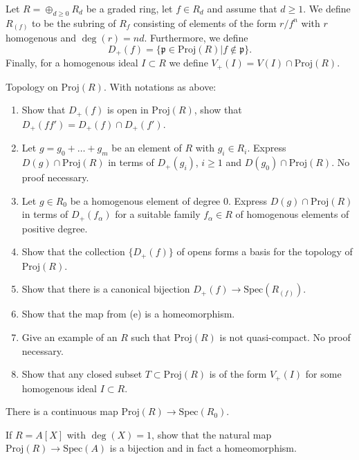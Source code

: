 \begin{definition}
\label{definition-Dplus-Vplus}
Let $R = \oplus_{d \geq 0} R_d$ be a graded ring, let $f\in R_d$ and
assume that $d \geq 1$. We define {\it $R_{(f)}$} to be the subring of
$R_f$ consisting of elements of the form $r/f^n$ with $r$ homogenous and
$\deg(r) = nd$. Furthermore, we define
$$
D_{+}(f) = \{ {\mathfrak p} \in \text{Proj}(R) | f \not\in {\mathfrak p} \}.
$$
Finally, for a homogenous ideal $I \subset R$ we define
$V_{+}(I) = V(I) \cap \text{Proj}(R)$.
\end{definition}

\begin{exercise}
\label{exercise-topology-proj}
Topology on $\text{Proj}(R)$. With notations as above:
\begin{enumerate}
\item Show that $D_{+}(f)$ is open in $\text{Proj}(R)$, show that
$D_{+}(ff') = D_{+}(f) \cap D_{+}(f')$.
\item Let $g = g_0 + \ldots + g_m$ be an element
of $R$ with $g_i \in R_i$. Express $D(g) \cap \text{Proj}(R)$
in terms of $D_{+}(g_i)$, $i \geq 1$ and $D(g_0) \cap \text{Proj}(R)$.
No proof necessary.
\item Let $g\in R_0$ be a homogenous element of degree $0$.
Express $D(g) \cap \text{Proj}(R)$ in terms of $D_{+}(f_\alpha)$ for a suitable
family $f_\alpha \in R$ of homogenous elements of positive degree.
\item Show that the collection $\{D_{+}(f)\}$ of opens forms a
basis for the topology of $\text{Proj}(R)$.
\item Show that there is a canonical bijection
$D_{+}(f) \to \text{Spec}(R_{(f)})$.
\item Show that the map from (e) is a homeomorphism.
\item Give an example of an $R$ such that $\text{Proj}(R)$ is not
quasi-compact. No proof necessary.
\item Show that any closed subset $T \subset \text{Proj}(R)$ is of
the form $V_{+}(I)$ for some homogenous ideal $I \subset R$.
\end{enumerate}
\end{exercise}

\begin{remark}
\label{remark-continuous-proj-spec}
There is a continuous map $ \text{Proj}(R) \longrightarrow \text{Spec}(R_0) $.
\end{remark}

\begin{exercise}
\label{exercise-iso-polynomial-ring-one-variable}
If $R = A[X]$ with $\deg(X) = 1$, show that the natural map
$\text{Proj}(R) \to \text{Spec}(A)$ is a bijection and in fact
a homeomorphism.
\end{exercise}

